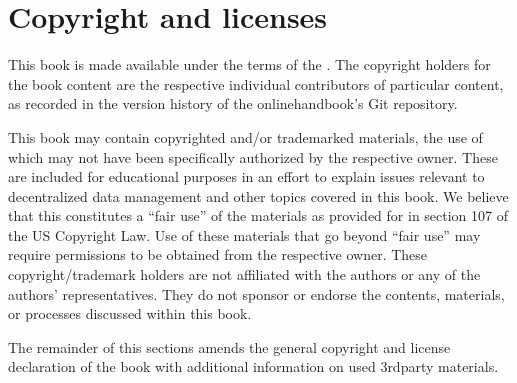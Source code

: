 \sphinxstepscope

\ignorespaces 

\section{Copyright and licenses}
\label{\detokenize{licenses:copyright-and-licenses}}\label{\detokenize{licenses:index-0}}\label{\detokenize{licenses::doc}}
\sphinxAtStartPar
This book is made available under the terms of the .
The copyright holders for the book content are the respective individual contributors of particular content, as recorded in the version history of the online\sphinxhyphen{}handbook’s Git repository.

\sphinxAtStartPar
This book may contain copyrighted and/or trademarked materials, the use of which may not have been specifically authorized by the respective owner.
These are included for educational purposes in an effort to explain issues relevant to decentralized data management and other topics covered in this book.
We believe that this constitutes a “fair use” of the materials as provided for in section 107 of the US Copyright Law.
Use of these materials that go beyond “fair use” may require permissions to be obtained from the respective owner.
These copyright/trademark holders are not affiliated with the authors or any of the authors’ representatives.
They do not sponsor or endorse the contents, materials, or processes discussed within this book.

\sphinxAtStartPar
The remainder of this sections amends the general copyright and license declaration of the book with additional information on used 3rd\sphinxhyphen{}party materials.


